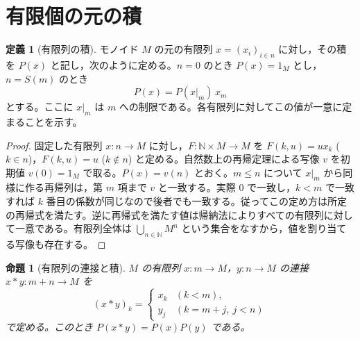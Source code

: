 \documentclass[a5paper,10pt,dvipdfmx]{jsarticle}
\theoremstyle{definition}
\newtheorem{defn}[ruledef]{定義}
\theoremstyle{plain}
\newtheorem{prop}[ruledef]{命題}
\newcommand{\GenronRefText}[2]{#2}
\begin{document}
\section{有限個の元の積}
\begin{defn}[有限列の積]\label{k165}
モノイド $M$ の元の有限列 $x=(x_i)_{i\in n}$ に対し，その積を $P(x)$ と記し，次のように定める。$n=0$ のとき $P(x)=1_M$ とし，$n=S(m)$ のとき
\[P(x)=P(x|_m)\,x_m\]
とする。ここに $x|_m$ は $m$ への制限である。各有限列に対してこの値が一意に定まることを示す。
\end{defn}
\begin{proof}
固定した有限列 $x\colon n\to M$ に対し，$F\colon\mathbb N\times M\to M$ を $F(k,u)=ux_k$ ($k\in n$)，$F(k,u)=u$ ($k\notin n$) と定める。\GenronRefText{K-000105}{自然数上の再帰定理}による写像 $v$ を初期値 $v(0)=1_M$ で取る。$P(x)=v(n)$ とおく。$m\leq n$ について $x|_m$ から同様に作る再帰列は，第 $m$ 項まで $v$ と一致する。実際 $0$ で一致し，$k<m$ で一致すれば $k$ 番目の係数が同じなので後者でも一致する。従ってこの定め方は所定の再帰式を満たす。逆に再帰式を満たす値は帰納法によりすべての有限列に対して一意である。有限列全体は $\bigcup_{n\in\mathbb N}M^n$ という集合をなすから，値を割り当てる写像も存在する。
\end{proof}
\begin{prop}[有限列の連接と積]\label{k166}
$M$ の有限列 $x\colon m\to M$，$y\colon n\to M$ の連接 $x*y\colon m+n\to M$ を
\[
(x*y)_k=\begin{cases}x_k &(k<m),\\y_j &(k=m+j,\ j<n)\end{cases}
\]
で定める。このとき $P(x*y)=P(x)P(y)$ である。
\end{prop}
\end{document}
